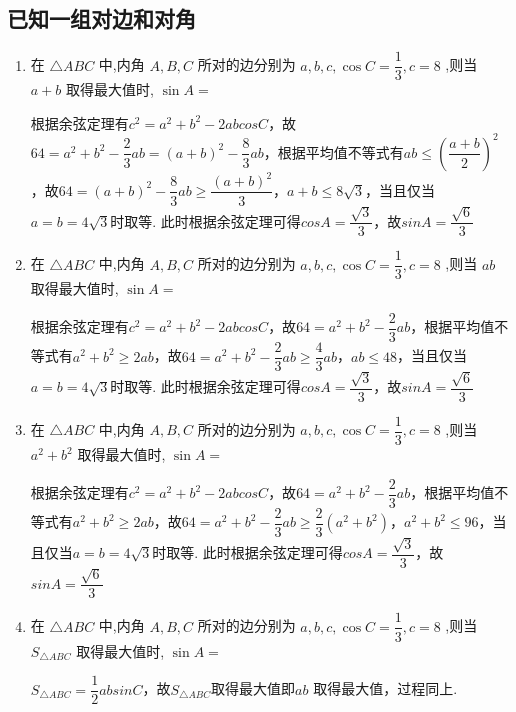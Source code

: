 \subsection*{已知一组对边和对角}
\begin{enumerate}
    \item 在 $\bigtriangleup  {ABC}$ 中,内角 $A,B,C$ 所对的边分别为 $a,b,c,\cos C = \dfrac{1}{3},c = 8$ ,则当 $a + b$ 取得最大值时, $\sin A =$
    \begin{jieda}
        根据余弦定理有$c^2 = a^2+b^2-2abcosC$，故$64 = a^2+b^2-\dfrac{2}{3}ab = (a+b)^2 - \dfrac{8}{3}ab$，根据平均值不等式有$ab \leq \left(\dfrac{a+b}{2}\right)^2$，故$64 = (a+b)^2 - \dfrac{8}{3}ab \geq \dfrac{(a+b)^2}{3}$，$a+b \leq 8\sqrt{3}$，当且仅当$a = b = 4\sqrt{3}$时取等. 此时根据余弦定理可得$cosA = \dfrac{\sqrt{3}}{3}$，故$sinA = \dfrac{\sqrt{6}}{3}$
    \end{jieda}
    \item 在 $\bigtriangleup  {ABC}$ 中,内角 $A,B,C$ 所对的边分别为 $a,b,c,\cos C = \dfrac{1}{3},c = 8$ ,则当 $ab$ 取得最大值时, $\sin A =$\begin{jieda}
        根据余弦定理有$c^2 = a^2+b^2-2abcosC$，故$64 = a^2+b^2-\dfrac{2}{3}ab$，根据平均值不等式有$a^2+b^2 \geq 2ab$，故$64 = a^2+b^2-\dfrac{2}{3}ab \geq \dfrac{4}{3}ab$，$ab \leq 48$，当且仅当$a = b = 4\sqrt{3}$时取等. 此时根据余弦定理可得$cosA = \dfrac{\sqrt{3}}{3}$，故$sinA = \dfrac{\sqrt{6}}{3}$
    \end{jieda}
    \item 在 $\bigtriangleup  {ABC}$ 中,内角 $A,B,C$ 所对的边分别为 $a,b,c,\cos C = \dfrac{1}{3},c = 8$ ,则当 $a^2 + b^2$ 取得最大值时, $\sin A =$
    \begin{jieda}
        根据余弦定理有$c^2 = a^2+b^2-2abcosC$，故$64 = a^2+b^2-\dfrac{2}{3}ab$，根据平均值不等式有$a^2+b^2 \geq 2ab$，故$64 = a^2+b^2-\dfrac{2}{3}ab \geq \dfrac{2}{3}(a^2+b^2)$，$a^2+b^2 \leq 96$，当且仅当$a = b = 4\sqrt{3}$时取等. 此时根据余弦定理可得$cosA = \dfrac{\sqrt{3}}{3}$，故$sinA = \dfrac{\sqrt{6}}{3}$
    \end{jieda}
    \item 在 $\bigtriangleup  {ABC}$ 中,内角 $A,B,C$ 所对的边分别为 $a,b,c,\cos C = \dfrac{1}{3},c = 8$ ,则当 $S_{\triangle ABC}$ 取得最大值时, $\sin A =$
    \begin{jieda}
        $S_{\triangle ABC} = \dfrac{1}{2}absinC$，故$S_{\triangle ABC}$取得最大值即$ab$ 取得最大值，过程同上.
    \end{jieda}

\end{enumerate}
